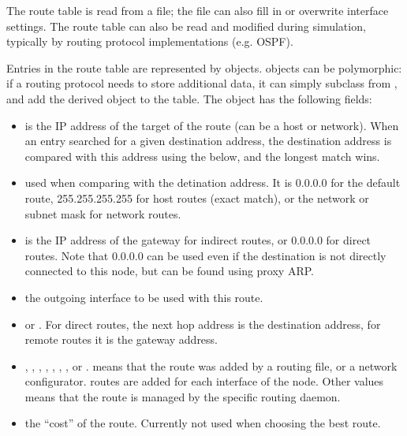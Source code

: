 The route table is read from a file; the file can
also fill in or overwrite interface settings. The route table can also
be read and modified during simulation, typically by routing protocol
implementations (e.g. OSPF).

Entries in the route table are represented by  objects.
 objects can be polymorphic: if a routing protocol needs
to store additional data, it can simply subclass from ,
and add the derived object to the table. The  object
has the following fields:
\begin{itemize}
  \item {} is the IP address of the target of the route (can be a host or network).
                   When an entry searched for a given destination address, the destination
                   address is compared with this  address using the 
                   below, and the longest match wins.
  \item {} used when comparing  with the detination address.
                     It is 0.0.0.0 for the default route, 255.255.255.255 for
                     host routes (exact match), or the network or subnet mask
                     for network routes.
  \item {} is the IP address of the gateway for indirect routes, or
                      0.0.0.0 for direct routes. Note that 0.0.0.0 can be used
                      even if the destination is not directly connected to this
                      node, but can be found using proxy ARP. 
  \item {} the outgoing interface to be used with this route.
  \item {}  or . For direct routes, the next hop
                   address is the destination address, for remote routes it is
                   the gateway address.
  \item {} , , , ,
        , , , or .  means
        that the route was added by a routing file, or a network configurator.
         routes are added for each interface of the node.
        Other values means that the route is managed by the specific routing
        daemon.
  \item {} the ``cost'' of the route. Currently not used when choosing
                     the best route.
\end{itemize}

